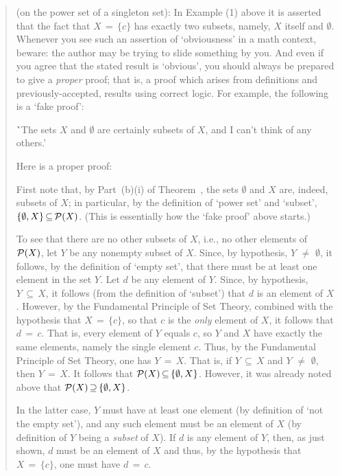 \begin{quotation}
{\footnotesize \underline{\Note} (on the power set of a singleton set): 
    In Example (1) above it is asserted that the fact that $X \,=\, \{c\}$ has exactly two subsets, namely, $X$ itself and ${\emptyset}$.
    Whenever you see such an assertion of `obviousness' in a math context, beware:
    the author may be trying to slide something by you. And even if you agree that the stated result is `obvious',
    you should always be prepared to give a {\em proper} proof; that is, a proof which arises from definitions and previously-accepted, results using correct logic.
    For example, the following is a `fake proof':

\VA

        \h `The sets $X$ and ${\emptyset}$ are certainly subsets of $X$, and I can't think of any others.'

\VA

\noindent Here is a proper proof:

        First note that, by Part~(b)(i) of Theorem~, the sets ${\emptyset}$ and $X$ are, indeed, subsets of $X$;
    in particular, by the definition of `power set' and `subset', $\{{\emptyset}, X\} \,{\subseteq}\, {\cal P}(X)$.
    (This is essentially how the `fake proof' above starts.)

        To see that there are no other subsets of $X$, i.e., no other elements of ${\cal P}(X)$, let $Y$ be any nonempty subset of $X$.
    Since, by hypothesis, $Y \,\,{\neq}\,\, {\emptyset}$, it follows,
    by the definition of `empty set', that there must be at least one element in the set $Y$.
    Let $d$ be any element of $Y$. Since, by hypothesis, $Y \,{\subseteq}\, X$, it follows (from the definition of `subset') that $d$ is an element of $X$.
    However, by the Fundamental Principle of Set Theory, combined with the hypothesis that $X \,=\, \{c\}$,
    so that $c$ is the {\em only} element of $X$, it follows that $d \,=\, c$.
    That is, every element of $Y$ equals $c$, so $Y$ and $X$ have exactly the same elements,
    namely the single element $c$. Thus, by the Fundamental Principle of Set Theory, one has $Y \,=\, X$.
    That is, if $Y \,{\subseteq}\, X$ and $Y \,\,{\neq}\,\, {\emptyset}$, then $Y \,=\, X$.
    It follows that ${\cal P}(X) \,{\subseteq}\, \{{\emptyset},X\}$. However, it was already noted above that ${\cal P}(X) \,{\supseteq}\, \{{\emptyset},X\}$.

    
    In the latter case, $Y$ must have at least one element (by definition of `not the empty set'),
    and any such element must be an element of $X$ (by definition of $Y$ being a {\em subset} of $X$).
    If $d$ is any element of $Y$, then, as just shown, $d$ must be an element of $X$ and thus, by the hypothesis that $X \,=\, \{c\}$, one must have $d \,=\, c$.
}%
\end{quotation} 



